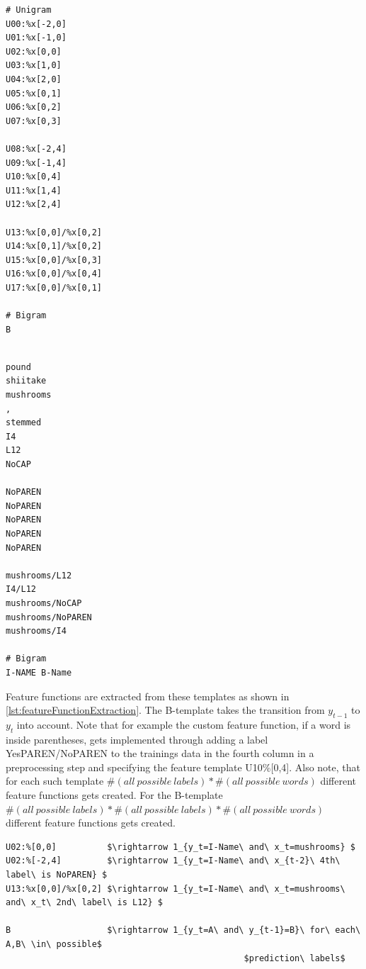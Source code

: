 \documentclass[12pt, twoside]{report}
\begin{document}
\newpage
\begin{minipage}{0.4\textwidth} 
\begin{lstlisting}[frame=single, caption={Feature templates for New York Times CRF}, label=lst:NYTfeatureTemplates]
# Unigram               
U00:%x[-2,0]             
U01:%x[-1,0]              
U02:%x[0,0]
U03:%x[1,0]
U04:%x[2,0]
U05:%x[0,1]
U06:%x[0,2]
U07:%x[0,3]

U08:%x[-2,4]
U09:%x[-1,4]
U10:%x[0,4]
U11:%x[1,4]
U12:%x[2,4]

U13:%x[0,0]/%x[0,2]
U14:%x[0,1]/%x[0,2]
U15:%x[0,0]/%x[0,3]
U16:%x[0,0]/%x[0,4]
U17:%x[0,0]/%x[0,1]

# Bigram
B
\end{lstlisting}
\end{minipage}
\hfill
\begin{minipage}{0.5\textwidth} 
\begin{lstlisting}[frame=single, caption={Derived value when the current word in \cref{lst:NYTTrainingData} is mushrooms}, label=lst:NYTfeatureTemplatesDerivedValue]
            
pound            
shiitake            
mushrooms
,
stemmed
I4
L12
NoCAP

NoPAREN
NoPAREN
NoPAREN
NoPAREN
NoPAREN

mushrooms/L12
I4/L12
mushrooms/NoCAP
mushrooms/NoPAREN
mushrooms/I4

# Bigram
I-NAME B-Name
\end{lstlisting}
\end{minipage}

Feature functions are extracted from these templates as shown in \cref{lst:featureFunctionExtraction}. The B-template takes the transition from $y_{t-1}$ to $y_t$ into account. Note that for example the custom feature function, if a word is inside parentheses, gets implemented through adding a label YesPAREN/NoPAREN to the trainings data in the fourth column in a preprocessing step and specifying the feature template U10\%[0,4]. Also note, that for each such template $\#(all\ possible\ labels)*\#(all\ possible\ words)$ different feature functions gets created. For the B-template $\#(all\ possible\ labels)*\#(all\ possible\ labels)*\#(all\ possible\ words)$ different feature functions gets created.

\begin{lstlisting}[frame=single, caption={Extracting of feature functions from templates}, label=lst:featureFunctionExtraction, mathescape]
U02:%[0,0]          $\rightarrow 1_{y_t=I-Name\ and\ x_t=mushrooms} $
U02:%[-2,4]         $\rightarrow 1_{y_t=I-Name\ and\ x_{t-2}\ 4th\ label\ is NoPAREN} $
U13:%x[0,0]/%x[0,2] $\rightarrow 1_{y_t=I-Name\ and\ x_t=mushrooms\ and\ x_t\ 2nd\ label\ is L12} $

B                   $\rightarrow 1_{y_t=A\ and\ y_{t-1}=B}\ for\ each\ A,B\ \in\ possible$
                                               $prediction\ labels$
\end{lstlisting}
\end{document}
